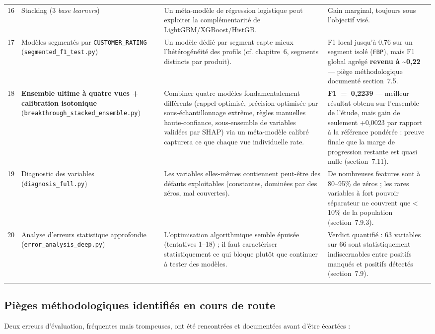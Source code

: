 \documentclass[11pt,a4paper]{report}
\let\oldbottomrule\bottomrule
\renewcommand{\bottomrule}{\arrayrulecolor{corpslate}\oldbottomrule\arrayrulecolor{black}}
\begin{document}
\begin{center}
\begin{longtable}{@{}p{0.7cm}p{3.4cm}p{5.3cm}p{5.3cm}@{}}
16 & Stacking (3 \textit{base learners}) & Un méta-modèle de régression logistique peut exploiter la complémentarité de LightGBM/XGBoost/HistGB. & Gain marginal, toujours sous l'objectif visé. \\
17 & Modèles segmentés par \texttt{CUSTOMER\_RATING} (\texttt{segmented\_f1\_test.py}) & Un modèle dédié par segment capte mieux l'hétérogénéité des profils (cf. chapitre~6, segments distincts par produit). & F1 local jusqu'à 0,76 sur un segment isolé (\texttt{FBP}), mais F1 global agrégé \textbf{revenu à \textasciitilde 0,22} — piège méthodologique documenté section~7.5. \\
18 & \textbf{Ensemble ultime à quatre vues + calibration isotonique} (\texttt{breakthrough\_stacked\_ensemble.py}) & Combiner quatre modèles fondamentalement différents (rappel-optimisé, précision-optimisée par sous-échantillonnage extrême, règles manuelles haute-confiance, sous-ensemble de variables validées par SHAP) via un méta-modèle calibré capturera ce que chaque vue individuelle rate. & \textbf{F1~=~0,2239} — meilleur résultat obtenu sur l'ensemble de l'étude, mais gain de seulement +0,0023 par rapport à la référence pondérée : preuve finale que la marge de progression restante est quasi nulle (section~7.11). \\
19 & Diagnostic des variables (\texttt{diagnosis\_full.py}) & Les variables elles-mêmes contiennent peut-être des défauts exploitables (constantes, dominées par des zéros, mal couvertes). & De nombreuses features sont à 80--95\% de zéros ; les rares variables à fort pouvoir séparateur ne couvrent que \textless\,10\% de la population (section~7.9.3). \\
20 & Analyse d'erreurs statistique approfondie (\texttt{error\_analysis\_deep.py}) & L'optimisation algorithmique semble épuisée (tentatives 1--18) ; il faut caractériser statistiquement ce qui bloque plutôt que continuer à tester des modèles. & Verdict quantifié : 63 variables sur 66 sont statistiquement indiscernables entre positifs manqués et positifs détectés (section~7.9). \\
\bottomrule
\end{longtable}
\end{center}

\subsection{Pièges méthodologiques identifiés en cours de route}
\statutFait{}
Deux erreurs d'évaluation, fréquentes mais trompeuses, ont été rencontrées
et documentées avant d'être écartées :
\end{document}
